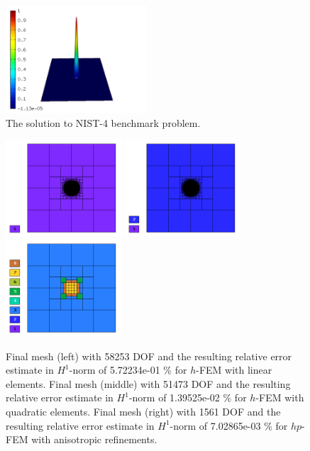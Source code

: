\documentclass[12pt]{elsarticle}
\begin{document}
\begin{figure}[H]
\centering
\vspace{-5mm}
\includegraphics[height=4cm]{nist/nist-4/solution.png}
\vspace{-5mm}
\caption{The solution to NIST-4 benchmark problem.}
\vspace{-2mm}
\label{fig:sln-nist04}
\end{figure}

\begin{figure}[H]
\centering
\vspace{-5mm}
\includegraphics[height=3.6cm]{nist/nist-4/mesh_h1_aniso.png}
\includegraphics[height=3.6cm]{nist/nist-4/mesh_h2_aniso.png}
\includegraphics[height=3.6cm]{nist/nist-4/mesh_hp_aniso.png}
\vspace{-5mm}
\caption{
Final mesh (left) with 58253 DOF and the resulting
relative error estimate in $H^1$-norm of 5.72234e-01 \% for $h$-FEM with linear elements.
Final mesh (middle) with 51473 DOF and the resulting
relative error estimate in $H^1$-norm of 1.39525e-02 \% for $h$-FEM with quadratic elements.
Final mesh (right) with 1561 DOF and the resulting
relative error estimate in $H^1$-norm of 7.02865e-03 \% for $hp$-FEM with anisotropic refinements.}
\vspace{-5mm}
\label{fig:nist-4-hp-aniso}
\end{figure}
\end{document}
